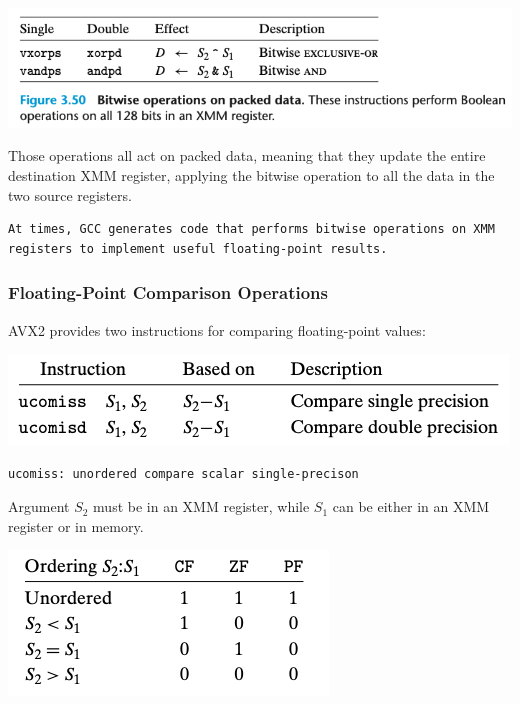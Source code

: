\documentclass[11pt]{article}
\begin{document}
\begin{center}
\includegraphics[width=.9\linewidth]{pics/bitwise-operation-on-packed-data.png}
\end{center}

Those operations all act on packed data, meaning that they update the entire destination XMM register, applying the bitwise operation to all the data in the two source registers.\\

\begin{verbatim}
At times, GCC generates code that performs bitwise operations on XMM registers to implement useful floating-point results.
\end{verbatim}


\subsubsection{Floating-Point Comparison Operations}
\label{sec:orgce0a4a2}
AVX2 provides two instructions for comparing floating-point values:\\

\begin{center}
\includegraphics[width=.9\linewidth]{pics/floating-point-comparison-operations.png}
\end{center}

\begin{verbatim}
ucomiss: unordered compare scalar single-precison
\end{verbatim}

Argument \(S_2\) must be in an XMM register, while \(S_1\) can be either in an XMM register or in memory.\\

\begin{center}
\includegraphics[width=.9\linewidth]{pics/floating-point-condition-codes.png}
\end{center}
\end{document}

